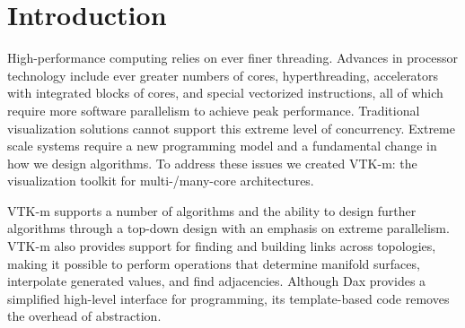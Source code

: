 
\chapter{Introduction}
\label{chap:Introduction}

High-performance computing relies on ever finer threading. Advances in
processor technology include ever greater numbers of cores, hyperthreading,
accelerators with integrated blocks of cores, and special vectorized
instructions, all of which require more software parallelism to achieve
peak performance. Traditional visualization solutions cannot support this
extreme level of concurrency. Extreme scale systems require a new
programming model and a fundamental change in how we design algorithms. To
address these issues we created VTK-m: the visualization toolkit for
multi-/many-core architectures.

VTK-m supports a number of algorithms and the ability to design further
algorithms through a top-down design with an emphasis on extreme
parallelism. VTK-m also provides support for finding and building links
across topologies, making it possible to perform operations that determine
manifold surfaces, interpolate generated values, and find adjacencies.
Although Dax provides a simplified high-level interface for programming,
its template-based code removes the overhead of abstraction.


